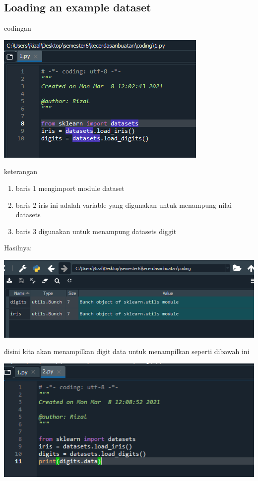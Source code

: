 \documentclass{article}
\begin{document}
    

\subsection{Loading an example dataset}
codingan

\begin{center}
    \includegraphics[width=.8\textwidth]{figures/1184033/chapter1/2.PNG}
\end{center}

keterangan
\begin{enumerate}
\item baris 1 mengimport module dataset
\item baris 2 iris ini adalah variable yang digunakan untuk menampung nilai datasets
\item baris 3 digunakan untuk menampung datasets diggit
\end{enumerate}
Hasilnya:
\begin{center}
    \includegraphics[width=.8\textwidth]{figures/1184033/chapter1/3.PNG}
\end{center}

disini kita akan menampilkan digit data untuk menampilkan seperti dibawah ini
\begin{center}
    \includegraphics[width=.8\textwidth]{figures/1184033/chapter1/4.PNG}
\end{center}
\end{document}
